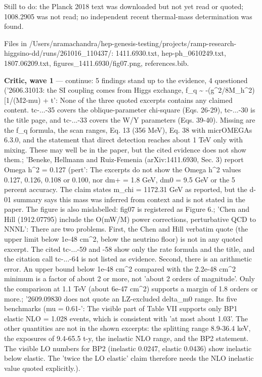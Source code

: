 \documentclass[11pt,a4paper]{article}
\begin{document}
Still to do: the Planck 2018 text was downloaded but not yet read or quoted; 1008.2905 was not read; no independent recent thermal-mass determination was found.

Files in /Users/nramachandra/hep-genesis-testing/projects/ramp-research-higgsino-dd/runs/261016\_110437/: 1411.6930.txt, hep-ph\_0610249.txt, 1807.06209.txt, figures\_1411.6930/fig07.png, references.bib.

\textbf{Critic, wave 1} --- continue: 5 findings stand up to the evidence, 4 questioned ('2606.31013: the SI coupling comes from Higgs exchange, f\_q \textasciitilde{} -(g\textasciicircum{}2/8M\_h\textasciicircum{}2)[1/(M2-\textbar{}mu\textbar{}) + t': None of the three quoted excerpts contains any claimed content. tc-...-35 covers the oblique-parameter chi-square (Eqs. 26-29), tc-...-30 is the title page, and tc-...-33 covers the W/Y parameters (Eqs. 39-40). Missing are the f\_q formula, the scan ranges, Eq. 13 (356 MeV), Eq. 38 with micrOMEGAs 6.3.0, and the statement that direct detection reaches about 1 TeV only with mixing. These may well be in the paper, but the cited evidence does not show them.; 'Beneke, Hellmann and Ruiz-Femenia (arXiv:1411.6930, Sec. 3) report Omega h\textasciicircum{}2 = 0.127 (pert': The excerpts do not show the Omega h\textasciicircum{}2 values 0.127, 0.126, 0.108 or 0.100, nor dm+ = 1.8 GeV, dm0 = 9.5 GeV or the 5 percent accuracy. The claim states m\_chi = 1172.31 GeV as reported, but the d-01 summary says this mass was inferred from context and is not stated in the paper. The figure is also mislabelled: fig07 is registered as Figure 6.; 'Chen and Hill (1912.07795) include the O(mW/M) power corrections, perturbative QCD to NNNL': There are two problems. First, the Chen and Hill verbatim quote (the upper limit below 1e-48 cm\textasciicircum{}2, below the neutrino floor) is not in any quoted excerpt. The cited tc-...-59 and -58 show only the rate formula and the title, and the citation call tc-...-64 is not listed as evidence. Second, there is an arithmetic error. An upper bound below 1e-48 cm\textasciicircum{}2 compared with the 2.2e-48 cm\textasciicircum{}2 minimum is a factor of about 2 or more, not 'about 2 orders of magnitude'. Only the comparison at 1.1 TeV (about 6e-47 cm\textasciicircum{}2) supports a margin of 1.8 orders or more.; '2609.09830 does not quote an LZ-excluded delta\_m0 range. Its five benchmarks (\textbar{}mu\textbar{} = 0.61-': The visible part of Table VII supports only BP1 elastic NLO = 1.028 events, which is consistent with 'at most about 1.03'. The other quantities are not in the shown excerpts: the splitting range 8.9-36.4 keV, the exposures of 9.4-65.5 t-y, the inelastic NLO range, and the BP2 statement. The visible LO numbers for BP2 (inelastic 0.0247, elastic 0.0436) show inelastic below elastic. The 'twice the LO elastic' claim therefore needs the NLO inelastic value quoted explicitly.).
\end{document}
